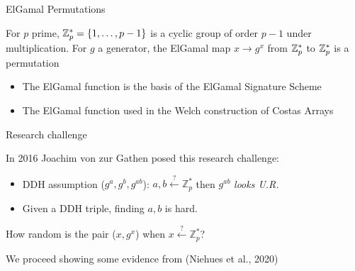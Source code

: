 
\begin{frame}{ElGamal Permutations}

For $p$ prime, $\mathbb{Z}_p^* = \{1, \ldots, p-1\}$ is a cyclic group of order $p-1$ under multiplication. For $g$ a generator, the ElGamal map $x \to g^x$ from $\mathbb{Z}_p^*$ to $\mathbb{Z}_p^*$ is a permutation
\vspace{1cm}

\begin{itemize}
\item The ElGamal function is the basis of the ElGamal Signature Scheme
  \item The ElGamal function used in the Welch construction of Costas Arrays
  \end{itemize}

  
\end{frame}




\begin{frame}{Research challenge}

In 2016 Joachim von zur Gathen posed this research challenge:

\begin{itemize}
    \item DDH assumption ($g^a, g^b, g^{ab}$): $a,b \overset{?}{\gets} \mathbb{Z}_p^*$ then $g^{ab}$ \emph{looks U.R.}
    \item Given a DDH triple, finding $a,b$ is hard.
\end{itemize}

\pause
\begin{center}
    {\Large
        How random is the pair ($x, g^x$) when $x \overset{?}{\gets} \mathbb{Z}_p^*$?
    }
\end{center}

\pause
    We proceed showing some evidence from (Niehues et al., 2020)

\end{frame}




